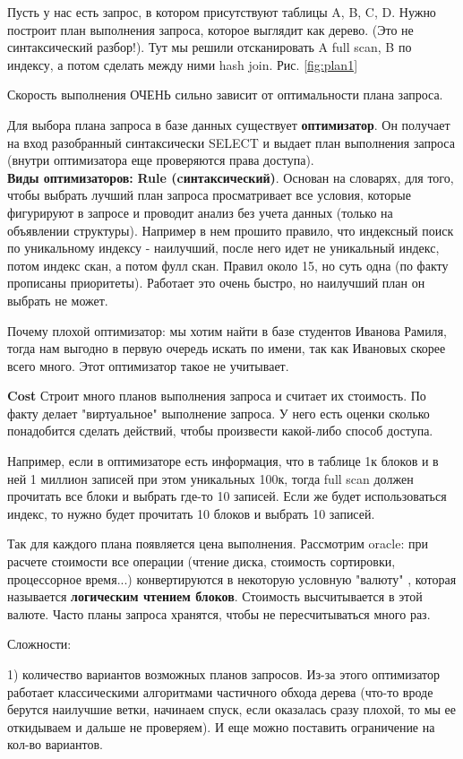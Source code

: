 Пусть у нас есть запрос, в котором присутствуют таблицы A, B, C, D. Нужно построит план выполнения запроса, которое выглядит как дерево. (Это не синтаксический разбор!). Тут мы решили отсканировать A full scan, B по индексу, а потом сделать между ними hash join. Рис. \ref{fig:plan1}

Скорость выполнения ОЧЕНЬ сильно зависит от оптимальности плана запроса.


Для выбора плана запроса в базе данных существует \textbf{оптимизатор}. Он получает на вход разобранный синтаксически SELECT и выдает план выполнения запроса (внутри оптимизатора еще проверяются права доступа). 
\\[60pt]
\textbf{Виды оптимизаторов:} 
\textbf{Rule (cинтаксический)}. Основан на словарях, для того, чтобы выбрать лучший план запроса просматривает все условия, которые фигурируют в запросе и проводит анализ без учета данных (только на объявлении структуры). Например в нем прошито правило, что индексный поиск по уникальному индексу - наилучший, после него идет не уникальный индекс, потом индекс скан, а потом фулл скан. Правил около 15, но суть одна (по факту прописаны приоритеты). Работает это очень быстро, но наилучший план он выбрать не может.

Почему плохой оптимизатор: мы хотим найти в базе студентов Иванова Рамиля, тогда нам выгодно в первую очередь искать по имени, так как Ивановых скорее всего много. Этот оптимизатор такое не учитывает. 

\textbf{Cost} Строит много планов выполнения запроса и считает их стоимость. По факту делает "виртуальное" выполнение запроса. У него есть оценки сколько понадобится сделать действий, чтобы произвести какой-либо способ доступа. 

Например, если в оптимизаторе есть информация, что в таблице 1к блоков и в ней 1 миллион записей при этом уникальных 100к, тогда full scan должен прочитать все блоки и выбрать где-то 10 записей. Если же будет использоваться индекс, то нужно будет прочитать 10 блоков и выбрать 10 записей. 

Так для каждого плана появляется цена выполнения. Рассмотрим oracle: при расчете стоимости все операции (чтение диска, стоимость сортировки, процессорное время...) конвертируются в некоторую условную "валюту" , которая называется \textbf{логическим чтением блоков}. Стоимость высчитывается в этой валюте. Часто планы запроса хранятся, чтобы не пересчитываться много раз. 

Сложности: 

1) количество вариантов возможных планов запросов. Из-за этого оптимизатор работает классическими алгоритмами частичного обхода дерева (что-то вроде берутся наилучшие ветки, начинаем спуск, если оказалась сразу плохой, то мы ее откидываем и дальше не проверяем). И еще можно поставить ограничение на кол-во вариантов. 

